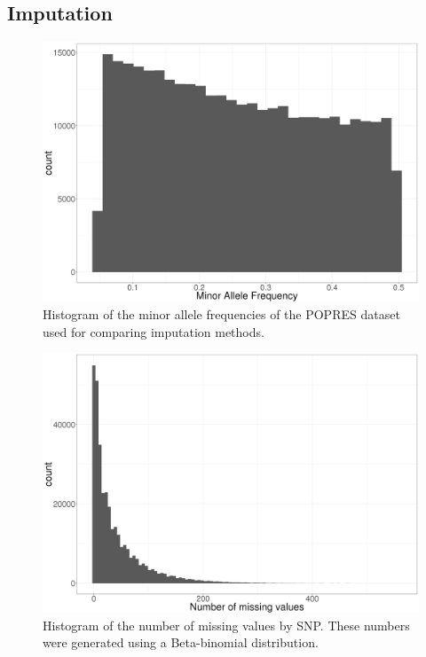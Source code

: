 \documentclass[a4paper, 11pt]{article}
\begin{document}
\clearpage

\subsection{Imputation}

\begin{figure}[!h]
\centerline{\includegraphics[width=\textwidth]{hist-maf}}
\caption{Histogram of the minor allele frequencies of the POPRES dataset used for comparing imputation methods.}\label{fig:maf}
\end{figure}

\vspace{3em}

\begin{figure}[!h]
\centerline{\includegraphics[width=\textwidth]{hist-NA}}
\caption{Histogram of the number of missing values by SNP. These numbers were generated using a Beta-binomial distribution.}\label{fig:NA}
\end{figure}
\end{document}
